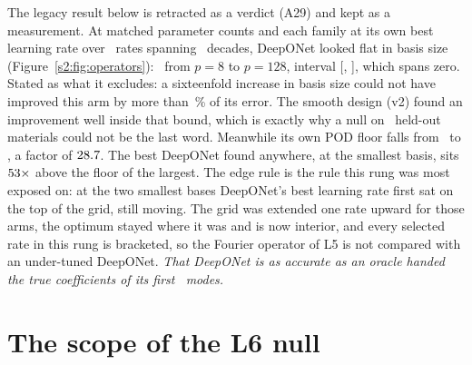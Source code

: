 The legacy result below is retracted as a verdict (A29) and kept as a measurement. At
matched parameter counts and each family at its own best learning rate over
\nLfiveNrates\ rates spanning \nLfiveDecades\ decades, DeepONet looked flat in basis
size (Figure~\ref{s2:fig:operators}): \nLfiveFlatDiff\ from \(p = 8\) to \(p = 128\),
interval [\nLfiveFlatLo, \nLfiveFlatHi], which spans zero. Stated as what it excludes:
a sixteenfold increase in basis size could not have improved this arm by more than
\nLfiveFlatImproveMax\,\% of its error. The smooth design (v2) found an improvement
well inside that bound, which is exactly why a null on \nNclustLegacy\ held-out
materials could not be the last word. Meanwhile its own POD
floor falls from \nLfiveFloorSmall\ to \nLfiveFloorLarge, a factor of
\(28.7\). The best DeepONet found anywhere, at the smallest basis, sits
\(53\times\) above the floor of the largest. The edge rule is the rule this
rung was most exposed on: at the two
smallest bases DeepONet's best learning rate first sat on the top of the grid, still
moving. The grid was extended one rate upward for those arms, the optimum stayed where
it was and is now interior, and every selected rate in this rung is bracketed, so
the Fourier operator of L5 is not compared with an under-tuned DeepONet. \emph{That DeepONet is as
accurate as an oracle handed the true coefficients of its first
\nLfiveOracleONet\ modes.}

\section{The scope of the L6 null}
\label{s2:sec5}

